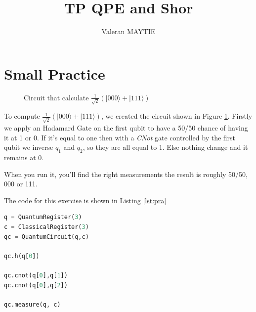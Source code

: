 \documentclass{article}
\title{TP QPE and Shor}
\author{Valeran MAYTIE}
\date{}
\theoremstyle{plain}
\begin{document}
  \maketitle

  \section{Small Practice}

    \begin{figure}[!htb]
      \begin{center}
    \end{center}
    \caption{Circuit that calculate $\frac1{\sqrt2}(|000\rangle+|111\rangle)$}
    \label{fig:cir1}
    \end{figure}

    To compute $\frac1{\sqrt2}(|000\rangle+|111\rangle)$, we created the
    circuit shown in Figure \ref{fig:cir1}. Firstly we apply an Hadamard Gate on
    the first qubit to have a 50/50 chance of having it at 1 or 0.
    If it's equal to one then with a \textit{CNot} gate controlled by the first
    qubit we inverse $q_1$ and $q_2$, so they are all equal to 1.
    Else nothing change and it remains at 0.

    When you run it, you'll find the right measurements the result is
    roughly 50/50, 000 or 111.

    The code for this exercise is shown in Listing \ref{lst:pra}

\begin{lstlisting}[language=Python, label= lst:pra,
                   caption=Code that generates the circuit in Figure \ref{fig:cir1}]
q = QuantumRegister(3)
c = ClassicalRegister(3)
qc = QuantumCircuit(q,c)

qc.h(q[0])

qc.cnot(q[0],q[1])
qc.cnot(q[0],q[2])

qc.measure(q, c)\end{lstlisting}
\end{document}
